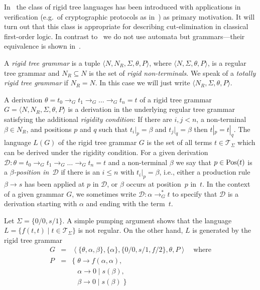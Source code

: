 \documentclass{LMCS}
\theoremstyle{plain}
\theoremstyle{definition}
\def\set#1{\{#1\}}
\def\tuple#1{\langle#1\rangle}
\newcommand{\Lang}[1]{L(#1)}	\newcommand{\Gram}[1]{\mathrm{G}(#1)}	\newcommand{\Gramreg}[1]{\mathrm{G}_0(#1)}
\newcommand{\TR}[1]{\mathcal{T}_{#1}}
\newcommand{\DD}{\mathcal{D}}
\newcommand{\derel}[1]{\mathbin{\rightarrow_{#1}}}
\newcommand{\sderel}[1]{\mathbin{\rightarrow_{#1}^*}}
\newcommand{\atpos}[2]{#1|_{#2}}
\begin{document}
In~\cite{Jacquemard09Rigid} the class of rigid tree languages has been
introduced with applications in verification (e.g.\ of cryptographic
protocols as in~\cite{Jacquemard11Rigid}) as primary motivation. It
will turn out that this class is appropriate for describing
cut-elimination in classical first-order logic. In contrast
to~\cite{Jacquemard09Rigid} we do not use automata but grammars---their
equivalence is shown
in~\cite{Hetzl12Applying}.

\begin{defi}
  A \emph{rigid tree grammar} is a tuple
  $\tuple{N,N_R,\Sigma,\theta,P}$, where $\tuple{N,\Sigma,\theta,P}$, is a
  regular tree grammar and $N_R\subseteq N$ is the set of \emph{rigid
    non-terminals}.  We speak of a \emph{totally rigid tree grammar} if
  $N_R=N$. In this case we will just write
  $\tuple{N_R,\Sigma,\theta,P}$.
\end{defi}

A derivation $\theta=t_0\derel{G}t_1\derel{G}\ldots\derel{G}t_n=t$ of a
rigid tree grammar $G=\tuple{N,N_R,\Sigma,\theta,P}$ is a derivation in
the underlying regular tree grammar satisfying the additional
\emph{rigidity condition}: If there are $i,j<n$, a non-terminal
  $\beta\in N_R$, and positions $p$ and $q$ such that
  $\atpos{t_i}{p}=\beta$ and $\atpos{t_j}{q}=\beta$ then
  $\atpos{t}{p}=\atpos{t}{q}$.
The language $\Lang{G}$ of the rigid
tree grammar $G$ is the set of all terms $t\in\TR{\Sigma}$ which can
be derived under the rigidity condition.
For a given derivation
$\DD\colon\theta=t_0\derel{G}t_1\derel{G}\ldots\derel{G}t_n=t$ and a
non-terminal $\beta$ we say that $p\in\mathrm{Pos}(t)$ is a
\emph{$\beta$-position in~$\DD$} if there is an $i\le n$ with
$\atpos{t_i}{p}=\beta$, i.e., either a production rule
$\beta\rightarrow s$ has been applied at $p$ in $\DD$, or $\beta$
occurs at position~$p$ in~$t$.  In the context of a given grammar $G$,
we sometimes write $\DD\colon\alpha\sderel{G} t$ to specify that
$\DD$ is a derivation starting with $\alpha$ and ending with the
term~$t$.

\begin{exa}
Let $\Sigma=\{0/0,s/1\}$. A simple pumping argument shows that the
language $L=\{ f(t,t) \mid t\in\TR{\Sigma} \}$ is not regular. On the
other hand, $L$ is generated by the rigid tree grammar 
\begin{eqnarray*}
  G&=&\left\langle \set{\theta,\alpha,\beta}, \set{\alpha} , \set{ 0/0, s/1, f/2 }, \theta,P\right\rangle
  \quad\text{where}\\
  P&=&\{\; \theta \rightarrow f(\alpha,\alpha),\\
  &&\phantom{\{\;}\alpha\rightarrow 0 \mid s(\beta), \\
  &&\phantom{\{\;}\beta \rightarrow 0 \mid s(\beta)\; \}
\end{eqnarray*}
\end{exa}
\end{document}
